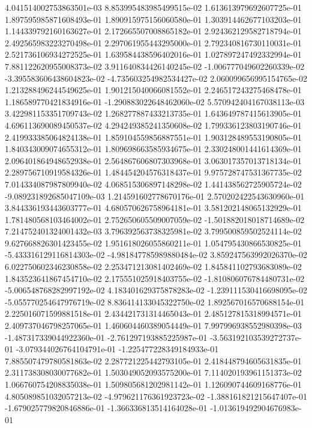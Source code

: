 4.041514002753863501e-03
8.853995483985499515e-02
1.613613979692607725e-01
1.897595985871608493e-01
1.890915975156060580e-01
1.303914462677103203e-01
1.144339792160163627e-01
2.172665507008865182e-01
2.924362129582718794e-01
2.492565983223270498e-01
2.297061955443295000e-01
2.792340816730110031e-01
2.521736106934272525e-01
1.639584438596402016e-01
1.027897247492332994e-01
7.881122620955008373e-02
3.911640834426140245e-02
-1.006777049602260339e-02
-3.395583606438604823e-02
-4.735603254982534427e-02
2.060099656995154765e-02
1.213288496244549625e-01
1.901215040066081552e-01
2.246517243275468478e-01
1.186589770421834916e-01
-1.290883022648462060e-02
5.570942404167038113e-03
3.422981153351709743e-02
1.268277887433213735e-01
1.643649787415613905e-01
4.696113690089450537e-02
4.294249385241350608e-02
1.799336123803190746e-01
2.419933385064824138e-01
1.859104559856887551e-01
1.903128489553190805e-01
1.840343009074655312e-01
1.809698663585934675e-01
2.330248001441614369e-01
2.096401864948652938e-01
2.564867606807303968e-01
3.063017357013718134e-01
2.289756710919584326e-01
1.484454204576318437e-01
9.975728747531367735e-02
7.014334087987809940e-02
4.068515306897148298e-02
1.441438562725905724e-02
-9.089231892685047109e-03
1.214591602778670176e-01
2.570202422543630960e-01
3.844336193443603777e-01
4.680570626758964181e-01
3.581202148065132929e-01
1.781480568103464002e-01
2.752650605509007059e-02
-1.501882018018714689e-02
7.214752401324001432e-03
3.796392563738325981e-02
3.799500859502524114e-02
9.627668826301423455e-02
1.951618026055860211e-01
1.054795430866530825e-01
-5.433316129116814303e-02
-4.981847785989880484e-02
3.859247563992026370e-02
6.022750602346230858e-02
2.253471213081402469e-02
1.845841102793683089e-02
1.843523641867454710e-02
2.175551025918403755e-02
-1.810806076784480731e-02
-5.006548768282997192e-02
4.183401629375878283e-02
-1.239111530416698095e-02
-5.055770254647976719e-02
8.836414133045322750e-02
1.892567016570688154e-01
2.225016071599881518e-01
2.434421731314465043e-01
2.485127815318994571e-01
2.409737046798257065e-01
1.460604460389054449e-01
7.997996938552980398e-03
-1.487317339044922360e-01
-2.761297193885225987e-01
-3.563192103539272737e-01
-3.079344026764104791e-01
-1.225477228349184933e-01
7.885507479780581863e-02
2.287721225442793105e-01
2.418448794605631835e-01
2.311738308030077682e-01
1.503049052093575200e-01
7.114020193961151373e-02
1.066760754208835038e-01
1.509805681202981142e-01
1.126090744609168776e-01
4.805089851032057213e-02
-4.979621176361923723e-02
-1.388161821215647407e-01
-1.679025779820846886e-01
-1.366336813514164028e-01
-1.013619492904676983e-01
